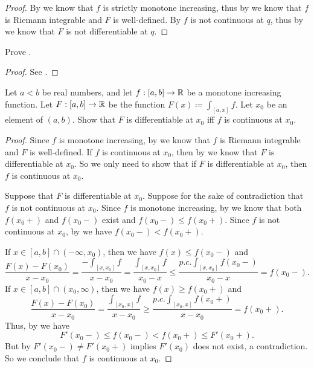\begin{proof}
  By  we know that \(f\) is strictly monotone increasing, thus by  we know that \(f\) is Riemann integrable and \(F\) is well-defined.
  By  \(f\) is not continuous at \(q\), thus by  we know that \(F\) is not differentiable at \(q\).
\end{proof}

\begin{ex}\label{i:ex:11.9.2}
  Prove .
\end{ex}

\begin{proof}
  See .
\end{proof}

\begin{ex}\label{i:ex:11.9.3}
  Let \(a < b\) be real numbers, and let \(f : [a, b] \to \mathbb{R}\) be a monotone increasing function.
  Let \(F : [a, b] \to \mathbb{R}\) be the function \(F(x) \coloneqq \int_{[a, x]} f\).
  Let \(x_0\) be an element of \((a, b)\).
  Show that \(F\) is differentiable at \(x_0\) iff \(f\) is continuous at \(x_0\).
\end{ex}

\begin{proof}
  Since \(f\) is monotone increasing, by  we know that \(f\) is Riemann integrable and \(F\) is well-defined.
  If \(f\) is continuous at \(x_0\), then by  we know that \(F\) is differentiable at \(x_0\).
  So we only need to show that if \(F\) is differentiable at \(x_0\), then \(f\) is continuous at \(x_0\).

  Suppose that \(F\) is differentiable at \(x_0\).
  Suppose for the sake of contradiction that \(f\) is not continuous at \(x_0\).
  Since \(f\) is monotone increasing, by  we know that both \(f(x_0+)\) and \(f(x_0-)\) exist and \(f(x_0-) \leq f(x_0+)\).
  Since \(f\) is not continuous at \(x_0\), by  we have \(f(x_0-) < f(x_0+)\).

  If \(x \in [a, b] \cap (-\infty, x_0)\), then we have \(f(x) \leq f(x_0-)\) and
  \[
    \dfrac{F(x) - F(x_0)}{x - x_0} = \dfrac{-\int_{[x, x_0]} f}{x - x_0} = \dfrac{\int_{[x, x_0]} f}{x_0 - x} \leq \dfrac{p.c. \int_{[x, x_0]} f(x_0-)}{x_0 - x} = f(x_0-).
  \]
  If \(x \in [a, b] \cap (x_0, \infty)\), then we have \(f(x) \geq f(x_0+)\) and
  \[
    \dfrac{F(x) - F(x_0)}{x - x_0} = \dfrac{\int_{[x_0, x]} f}{x - x_0} \geq \dfrac{p.c. \int_{[x_0, x]} f(x_0+)}{x - x_0} = f(x_0+).
  \]
  Thus, by  we have
  \[
    F'(x_0-) \leq f(x_0-) < f(x_0+) \leq F'(x_0+).
  \]
  But by  \(F'(x_0-) \neq F'(x_0+)\) implies \(F'(x_0)\) does not exist, a contradiction.
  So we conclude that \(f\) is continuous at \(x_0\).
\end{proof}
